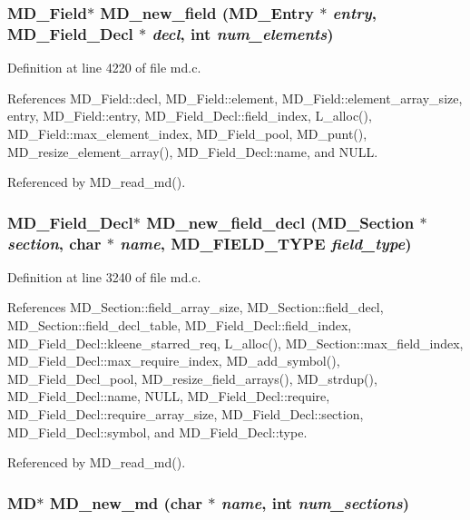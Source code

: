 \subsubsection{\setlength{\rightskip}{0pt plus 5cm}\bf{MD\_\-Field}$\ast$ MD\_\-new\_\-field (\bf{MD\_\-Entry} $\ast$ {\em entry}, \bf{MD\_\-Field\_\-Decl} $\ast$ {\em decl}, int {\em num\_\-elements})}\label{md_8h_fbc882977f12979165e7d5903d2272be}




Definition at line 4220 of file md.c.

References MD\_\-Field::decl, MD\_\-Field::element, MD\_\-Field::element\_\-array\_\-size, entry, MD\_\-Field::entry, MD\_\-Field\_\-Decl::field\_\-index, L\_\-alloc(), MD\_\-Field::max\_\-element\_\-index, MD\_\-Field\_\-pool, MD\_\-punt(), MD\_\-resize\_\-element\_\-array(), MD\_\-Field\_\-Decl::name, and NULL.

Referenced by MD\_\-read\_\-md().
\subsubsection{\setlength{\rightskip}{0pt plus 5cm}\bf{MD\_\-Field\_\-Decl}$\ast$ MD\_\-new\_\-field\_\-decl (\bf{MD\_\-Section} $\ast$ {\em section}, char $\ast$ {\em name}, \bf{MD\_\-FIELD\_\-TYPE} {\em field\_\-type})}\label{md_8h_dbb60e2a637334eb1c028ae19d8fd7a6}




Definition at line 3240 of file md.c.

References MD\_\-Section::field\_\-array\_\-size, MD\_\-Section::field\_\-decl, MD\_\-Section::field\_\-decl\_\-table, MD\_\-Field\_\-Decl::field\_\-index, MD\_\-Field\_\-Decl::kleene\_\-starred\_\-req, L\_\-alloc(), MD\_\-Section::max\_\-field\_\-index, MD\_\-Field\_\-Decl::max\_\-require\_\-index, MD\_\-add\_\-symbol(), MD\_\-Field\_\-Decl\_\-pool, MD\_\-resize\_\-field\_\-arrays(), MD\_\-strdup(), MD\_\-Field\_\-Decl::name, NULL, MD\_\-Field\_\-Decl::require, MD\_\-Field\_\-Decl::require\_\-array\_\-size, MD\_\-Field\_\-Decl::section, MD\_\-Field\_\-Decl::symbol, and MD\_\-Field\_\-Decl::type.

Referenced by MD\_\-read\_\-md().
\subsubsection{\setlength{\rightskip}{0pt plus 5cm}\bf{MD}$\ast$ MD\_\-new\_\-md (char $\ast$ {\em name}, int {\em num\_\-sections})}\label{md_8h_2074850b98f8fb845094a223994c8e4d}




